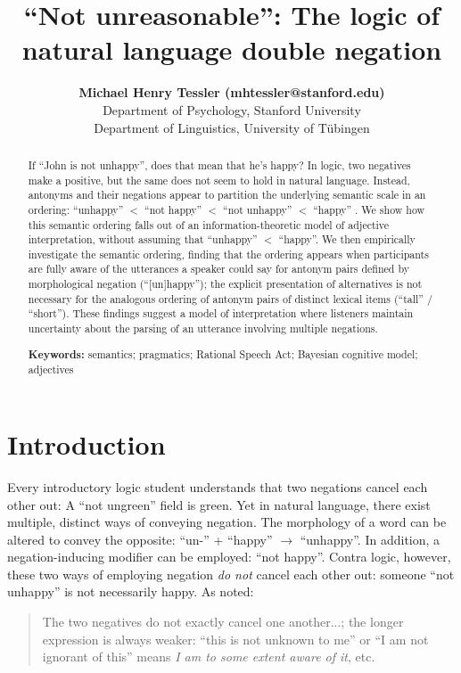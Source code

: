 \documentclass[10pt,letterpaper]{article}
\title{``Not unreasonable'': The logic of natural language double negation}
\author{{\large \bf Michael Henry Tessler (mhtessler@stanford.edu)} \\
  Department of Psychology, Stanford University 
  \AND {\large \bf Michael Franke (mchfranke@gmail.com)} \\
  Department of Linguistics, University of T\"{u}bingen}
\begin{document}
\maketitle


\begin{abstract}

If ``John is not unhappy'', does that mean that he's happy? 
In logic, two negatives make a positive, but the same does not seem to hold in natural language. 
Instead, antonyms and their negations appear to partition the underlying semantic scale in an ordering: ``unhappy'' $<$ ``not happy'' $<$ ``not unhappy'' $<$ ``happy'' \cite{Horn1989:Natural, Krifka2007:Negated-antonyms}. 
We show how this semantic ordering falls out of an information-theoretic model of adjective interpretation, without assuming that ``unhappy'' $<$ ``happy''.
We then empirically investigate the semantic ordering, finding that the ordering appears when participants are fully aware of the utterances a speaker could say for antonym pairs defined by morphological negation (``[un]happy''); the explicit presentation of alternatives is not necessary for the analogous ordering of antonym pairs of distinct lexical items (``tall'' / ``short''). 
These findings suggest a model of interpretation where listeners maintain uncertainty about the parsing of an utterance involving multiple negations.


\textbf{Keywords:} 
semantics; pragmatics; Rational Speech Act; Bayesian cognitive model; adjectives
\end{abstract}


\section{Introduction}

Every introductory logic student understands that two negations cancel each other out: A ``not ungreen'' field is green.
Yet in natural language, there exist multiple, distinct ways of conveying negation.  
The morphology of a word can be altered to convey the opposite: ``un-'' + ``happy'' $\rightarrow$ ``unhappy''.
In addition, a negation-inducing modifier can be employed: ``not happy''.
Contra logic, however, these two ways of employing negation \emph{do not} cancel each other out: someone ``not unhappy'' is not necessarily happy. 	
As  noted:
%
\begin{quote}
The two negatives do not exactly cancel one another...; the longer expression is always weaker: ``this is not unknown to me'' or ``I am not ignorant of this'' means \emph{I am to some extent aware of it}, etc.
\end{quote}
%
\end{document}
